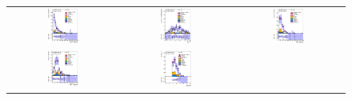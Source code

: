 \begin{figure}[h!]
\begin{center}
\begin{tabular}{ccc}
%
\includegraphics[width=0.30\textwidth]{appendices/figures/sdrs/LepPt_ELEMUONCR3_1W_NOMINAL.eps} &
\includegraphics[width=0.30\textwidth]{appendices/figures/sdrs/LepEta_ELEMUONCR3_1W_NOMINAL.eps} &
\includegraphics[width=0.30\textwidth]{appendices/figures/sdrs/MET_ELEMUONCR3_1W_NOMINAL.eps} \\
\includegraphics[width=0.30\textwidth]{appendices/figures/sdrs/Wlep_MassT_ELEMUONCR3_1W_NOMINAL.eps} &
\includegraphics[width=0.30\textwidth]{appendices/figures/sdrs/Njets25_ELEMUONCR3_1W_NOMINAL.eps}  &

\end{tabular}
\end{center}
\end{figure}
